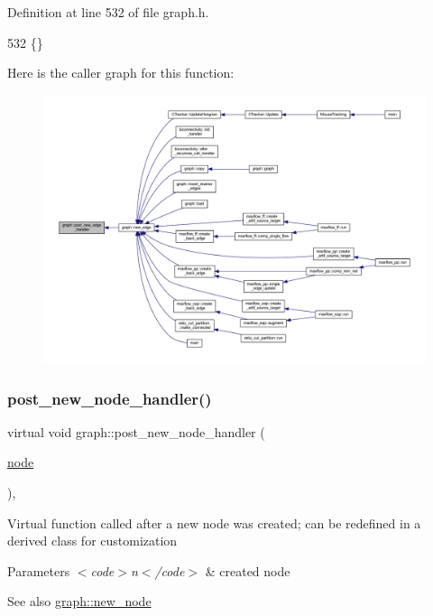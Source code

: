 Definition at line 532 of file graph.\+h.


\begin{DoxyCode}
532 \{\}          
\end{DoxyCode}
Here is the caller graph for this function\+:\nopagebreak
\begin{figure}[H]
\begin{center}
\leavevmode
\includegraphics[width=350pt]{classgraph_a443182426b461aa9f4b1c9f5ac535179_icgraph}
\end{center}
\end{figure}
\mbox{\label{classgraph_acfe5bc8bdad9fa426750901144319e5f}} 
\subsubsection{\texorpdfstring{post\+\_\+new\+\_\+node\+\_\+handler()}{post\_new\_node\_handler()}}
{\footnotesize\ttfamily virtual void graph\+::post\+\_\+new\+\_\+node\+\_\+handler (\begin{DoxyParamCaption}\item[{\mbox{\hyperlink{classnode}{node}}}]{ }\end{DoxyParamCaption})\hspace{0.3cm}{\ttfamily [inline]}, {\ttfamily [virtual]}}

Virtual function called after a new node was created; can be redefined in a derived class for customization


\begin{DoxyParams}{Parameters}
{\em $<$code$>$n$<$/code$>$} & created node \\
\hline
\end{DoxyParams}
\begin{DoxySeeAlso}{See also}
\mbox{\hyperlink{classgraph_ab9505335c20558319b6cce25aed23524}{graph\+::new\+\_\+node}} 
\end{DoxySeeAlso}


